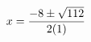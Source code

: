 \documentclass[preview]{standalone}
\begin{document}
\begin{align*}
\special{dvisvgm:raw <g id='unique000'>}x=\frac{-8\pm\sqrt{112}}{2(1)}\special{dvisvgm:raw </g>}
\end{align*}
\end{document}
